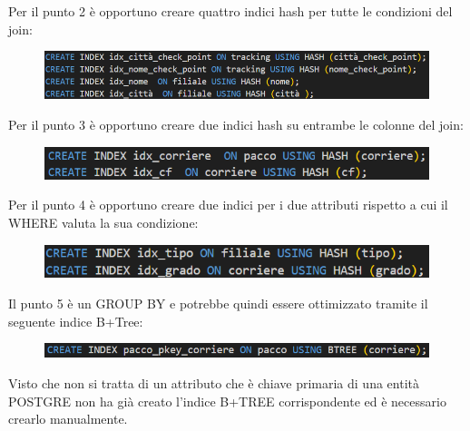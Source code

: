 \noindent Per il punto 2 è opportuno creare quattro indici hash per tutte le condizioni del join:
\begin{figure}[H]
\centering
\includegraphics[width=0.8 \textwidth]{Resources/INDEX2.png}
\label{I2}
\end{figure}

\noindent Per il punto 3 è opportuno creare due indici hash su entrambe le colonne del join:

\begin{figure}[H]
\centering
\includegraphics[width=0.7 \textwidth]{Resources/INDEX3.png}
\label{I3}
\end{figure}

\noindent Per il punto 4 è opportuno creare due indici per i due attributi rispetto a cui il WHERE valuta la sua condizione:

\begin{figure}[H]
\centering
\includegraphics[width=0.7 \textwidth]{Resources/INDEX4.png}
\label{I4}
\end{figure}

\noindent Il punto 5 è un GROUP BY e potrebbe quindi essere ottimizzato tramite il seguente indice B+Tree:
 
\begin{figure}[H]
\centering
\includegraphics[width=0.8 \textwidth]{Resources/INDEX5.png}
\label{I5}
\end{figure}  

\noindent Visto che non si tratta di un attributo che è chiave primaria di una entità POSTGRE non ha già creato l'indice B+TREE corrispondente ed è necessario crearlo manualmente.